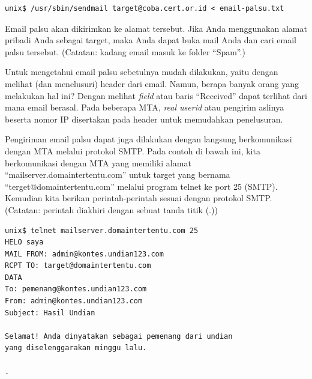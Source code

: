 \begin{mdframed}
\begin{verbatim}
unix$ /usr/sbin/sendmail target@coba.cert.or.id < email-palsu.txt
\end{verbatim}
\end{mdframed}

Email palsu akan dikirimkan ke alamat tersebut. Jika Anda menggunakan alamat
pribadi Anda sebagai target, maka Anda dapat buka mail Anda dan cari email
palsu tersebut. (Catatan: kadang email masuk ke folder ``Spam''.)

Untuk mengetahui email palsu sebetulnya mudah dilakukan, yaitu dengan melihat
(dan menelusuri) header dari email. Namun, berapa banyak orang yang melakukan
hal ini? Dengan melihat {\em field} atau baris ``Received'' dapat terlihat dari
mana email berasal. Pada beberapa MTA, {\em real userid} atau pengirim aslinya
beserta nomor IP disertakan pada header untuk memudahkan penelusuran.


Pengiriman email palsu dapat juga dilakukan dengan langsung berkomunikasi
dengan MTA melalui protokol SMTP. Pada contoh di bawah ini, kita berkomunikasi
dengan MTA yang memiliki alamat ``mailserver.domaintertentu.com'' untuk target
yang bernama ``terget@domaintertentu.com'' melalui program telnet ke port 25
(SMTP). Kemudian kita berikan perintah-perintah sesuai dengan protokol SMTP.
(Catatan: perintah diakhiri dengan sebuat tanda titik (.))

\begin{verbatim}
unix$ telnet mailserver.domaintertentu.com 25
HELO saya
MAIL FROM: admin@kontes.undian123.com
RCPT TO: target@domaintertentu.com
DATA
To: pemenang@kontes.undian123.com                                               
From: admin@kontes.undian123.com                                                
Subject: Hasil Undian                                                           
                                                                                
Selamat! Anda dinyatakan sebagai pemenang dari undian                           
yang diselenggarakan minggu lalu.  

.
\end{verbatim}
